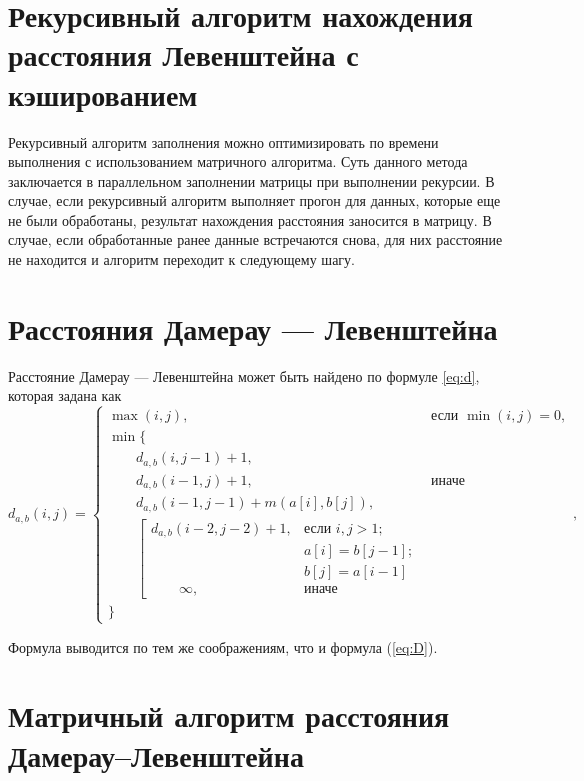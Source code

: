 \section{Рекурсивный алгоритм нахождения расстояния Левенштейна с кэшированием}
\label{sec:recmat}

Рекурсивный алгоритм заполнения можно оптимизировать по времени выполнения с использованием матричного алгоритма. Суть данного метода заключается в параллельном заполнении матрицы при выполнении рекурсии. В случае, если рекурсивный алгоритм выполняет прогон для данных, которые еще не были обработаны, результат нахождения расстояния заносится в матрицу. В случае, если обработанные ранее данные встречаются снова, для них расстояние не находится и алгоритм переходит к следующему шагу.





\section{Расстояния Дамерау — Левенштейна}

Расстояние Дамерау — Левенштейна может быть найдено по формуле \ref{eq:d}, которая задана как
\begin{equation}
	\label{eq:d}
	d_{a,b}(i, j) = \begin{cases}
		\max(i, j), &\text{если }\min(i, j) = 0,\\
		\min \lbrace \\
			\qquad d_{a,b}(i, j-1) + 1,\\
			\qquad d_{a,b}(i-1, j) + 1, &\text{иначе}\\
			\qquad d_{a,b}(i-1, j-1) + m(a[i], b[j]),\\
			\qquad \left[ \begin{array}{cc}d_{a,b}(i-2, j-2) + 1, &\text{если }i,j > 1;\\
			\qquad &\text{}a[i] = b[j-1]; \\
			\qquad &\text{}b[j] = a[i-1]\\
			\qquad \infty, & \text{иначе}\end{array}\right.\\
		\rbrace
		\end{cases},
\end{equation}

Формула выводится по тем же соображениям, что и формула (\ref{eq:D}).

\section{Матричный алгоритм расстояния Дамерау--Левенштейна}

